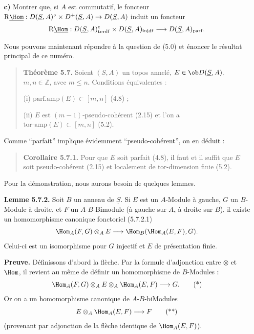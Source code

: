 \textbf{c)} Montrer que, si $A$ est commutatif, le foncteur $\mathrm{R}\underline{\Hom} : D(\underline{S}, A)^\circ \times D^+(\underline{S}, A) \to D(\underline{S}, A)$ induit un foncteur
\[
\mathrm{R}\underline{\Hom} : D(\underline{S}, A)_{\mathrm{tordf}}^\circ \times D(\underline{S}, A)_{\mathrm{injdf}} \longrightarrow D(\underline{S}, A)_{\mathrm{parf}}.
\]

Nous pouvons maintenant répondre à la question de (5.0) et énoncer le résultat principal de ce numéro.

\begin{quote}
\textbf{Théorème 5.7.} Soient $(\underline{S}, A)$ un topos annelé, $E \in \ob D(\underline{S}, A)$, $m, n \in \mathbb{Z}$, avec $m \leqslant n$. Conditions équivalentes :

(i) $\mathrm{parf.amp}(E) \subset [m, n]$ (4.8) ;

(ii) $E$ est $(m-1)$-pseudo-cohérent (2.15) et l'on a $\text{tor-amp}(E) \subset [m, n]$ (5.2).
\end{quote}

Comme ``parfait'' implique évidemment ``pseudo-cohérent'', on en déduit :

\begin{quote}
\textbf{Corollaire 5.7.1.} Pour que $E$ soit parfait (4.8), il faut et il suffit que $E$ soit pseudo-cohérent (2.15) et localement de tor-dimension finie (5.2).
\end{quote}

Pour la démonstration, nous aurons besoin de quelques lemmes.

\textbf{Lemme 5.7.2.} Soit $B$ un anneau de $\underline{S}$. Si $E$ est un $A$-Module à gauche, $G$ un $B$-Module à droite, et $F$ un $A$-$B$-Bimodule (à gauche sur $A$, à droite sur $B$), il existe un homomorphisme canonique fonctoriel (5.7.2.1)
\[
\Hom_A(F, G) \otimes_A E \longrightarrow \Hom_B(\Hom_A(E, F), G).
\]
Celui-ci est un isomorphisme pour $G$ injectif et $E$ de présentation finie.

\textbf{Preuve.} Définissons d'abord la flèche. Par la formule d'adjonction entre $\otimes$ et $\Hom$, il revient au même de définir un homomorphisme de $B$-Modules :
\[
\Hom_A(F, G) \otimes_A E \otimes_A \Hom_A(E, F) \longrightarrow G. \tag{*}
\]
Or on a un homomorphisme canonique de $A$-$B$-biModules
\[
E \otimes_A \Hom_A(E, F) \longrightarrow F \tag{**}
\]
(provenant par adjonction de la flèche identique de $\Hom_A(E, F)$).

